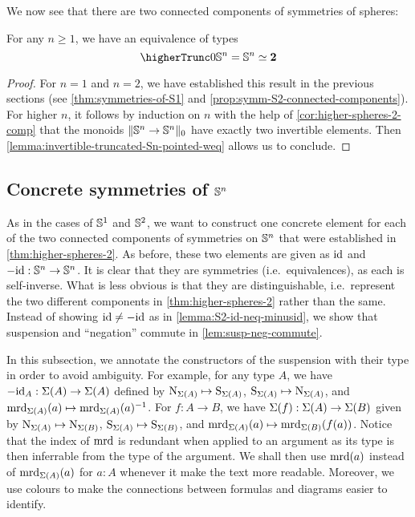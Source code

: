 \documentclass[english,a4paper]{lmcs}
\begin{document}
We now see that there are two connected components of symmetries of spheres:
\begin{thm} \label{thm:higher-spheres-2}
    For any $n \geq 1$, we have an equivalence of types
    \begin{equation}
    \higherTrunc 0 {\Sn n= \Sn n} \weq \bn 2
    \end{equation}
\end{thm}
\begin{proof}
  For $n = 1$ and $n=2$, we have established this result in the previous
  sections (see \cref{thm:symmetries-of-S1} and
  \cref{prop:symm-S2-connected-components}).  For higher $n$, it follows by
  induction on $n$ with the help of \cref{cor:higher-spheres-2-comp} that the
  monoids $\lVert{\mathbb S^{n}} \to {\mathbb S^{n}}\rVert_0$ have exactly two invertible elements.
  Then \cref{lemma:invertible-truncated-Sn-pointed-weq} allows us to conclude.
\end{proof}

\subsection{Concrete symmetries of \texorpdfstring{${\mathbb S^{n}}$}{Sn}}

As in the cases of ${{\mathbb S^{1}}}$ and ${{\mathbb S^{2}}}$, we want to construct one concrete element for each of the two connected components of symmetries on ${\mathbb S^{n}}$ that were established in \cref{thm:higher-spheres-2}.
As before, these two elements are given as $\mathord{\mathrm{id}}$ and $-\mathord{\mathrm{id}} : {\mathbb S^{n}} \to {\mathbb S^{n}}$.
It is clear that they are symmetries (i.e.\ equivalences), as each is self-inverse.
What is less obvious is that they are distinguishable, i.e.\ represent the two different components in \cref{thm:higher-spheres-2} rather than the same.
Instead of showing $\mathord{\mathrm{id}} \neq -\mathord{\mathrm{id}}$ as in \cref{lemma:S2-id-neq-minusid}, we show that suspension and ``negation'' commute in \cref{lem:susp-neg-commute}.

In this subsection, we annotate the constructors of the suspension with their type in order to avoid ambiguity.
For example, for any type $A$, we have $-\mathord{\mathrm{id}}_A : \operatorname{\Sigma}(A) \to \operatorname{\Sigma}(A)$ defined by
$\mathrm{N}_{\operatorname{\Sigma}(A)} \mapsto \mathrm{S}_{\operatorname{\Sigma}(A)}$,
$\mathrm{S}_{\operatorname{\Sigma}(A)} \mapsto \mathrm{N}_{\operatorname{\Sigma}(A)}$,
and $\operatorname{\mathrm{mrd}}_{\operatorname{\Sigma}(A)}(a) \mapsto \operatorname{\mathrm{mrd}}_{\operatorname{\Sigma}(A)}(a)^{-1}$.
For $f : A \to B$, we have $\operatorname{\Sigma}(f) : \operatorname{\Sigma}(A) \to \operatorname{\Sigma}(B)$ given by $\mathrm{N}_{\operatorname{\Sigma}(A)} \mapsto \mathrm{N}_{\operatorname{\Sigma}(B)}$,
$\mathrm{S}_{\operatorname{\Sigma}(A)} \mapsto \mathrm{S}_{\operatorname{\Sigma}(B)}$,
and $\operatorname{\mathrm{mrd}}_{\operatorname{\Sigma}(A)}(a) \mapsto \operatorname{\mathrm{mrd}}_{\operatorname{\Sigma}(B)}(f(a))$.
Notice that the index of $\operatorname{\mathrm{mrd}}$ is redundant when applied to an argument as its type is then inferrable from the type of the argument. We shall then use $\operatorname{\mathrm{mrd}}(a)$ instead of $\operatorname{\mathrm{mrd}}_{\operatorname{\Sigma}(A)}(a)$ for $a:A$ whenever it make the text more readable.
Moreover, we use colours to make the connections between formulas and diagrams easier to identify.
\end{document}
